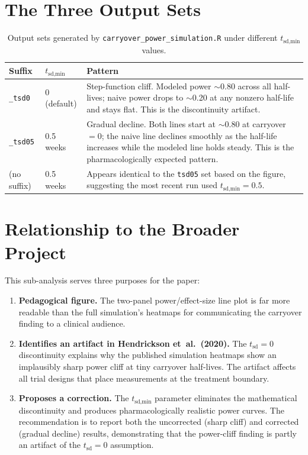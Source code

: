 \documentclass[11pt]{article}
\begin{document}
\section{The Three Output Sets}

\begin{table}[h]
\centering
\caption{Output sets generated by \texttt{carryover\_power\_simulation.R}
  under different $t_{\text{sd,min}}$ values.}
\label{tab:outputs}
\begin{tabular}{@{}llp{8cm}@{}}
\toprule
Suffix & $t_{\text{sd,min}}$ & Pattern \\
\midrule
\texttt{\_tsd0}
  & 0 (default)
  & Step-function cliff. Modeled power $\sim$0.80 across all
    half-lives; naive power drops to $\sim$0.20 at any nonzero
    half-life and stays flat. This is the discontinuity artifact. \\[6pt]
\texttt{\_tsd05}
  & 0.5 weeks
  & Gradual decline. Both lines start at $\sim$0.80 at carryover
    $= 0$; the naive line declines smoothly as the half-life
    increases while the modeled line holds steady. This is the
    pharmacologically expected pattern. \\[6pt]
(no suffix)
  & 0.5 weeks
  & Appears identical to the \texttt{tsd05} set based on the
    figure, suggesting the most recent run used
    $t_{\text{sd,min}} = 0.5$. \\
\bottomrule
\end{tabular}
\end{table}

\section{Relationship to the Broader Project}

This sub-analysis serves three purposes for the paper:

\begin{enumerate}
  \item \textbf{Pedagogical figure.} The two-panel power/effect-size
    line plot is far more readable than the full simulation's heatmaps
    for communicating the carryover finding to a clinical audience.

  \item \textbf{Identifies an artifact in Hendrickson et~al.\ (2020).}
    The $t_{\text{sd}} = 0$ discontinuity explains why the published
    simulation heatmaps show an implausibly sharp power cliff at tiny
    carryover half-lives. The artifact affects all trial designs that
    place measurements at the treatment boundary.

  \item \textbf{Proposes a correction.} The $t_{\text{sd,min}}$
    parameter eliminates the mathematical discontinuity and produces
    pharmacologically realistic power curves. The recommendation is to
    report both the uncorrected (sharp cliff) and corrected (gradual
    decline) results, demonstrating that the power-cliff finding is
    partly an artifact of the $t_{\text{sd}} = 0$ assumption.
\end{enumerate}
\end{document}
